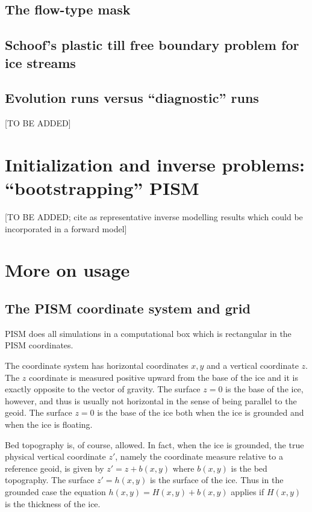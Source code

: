 \documentclass[11pt,final]{amsart}
\begin{document}
\subsection{The flow-type mask} \label{subsect:mask}  

\subsection{Schoof's plastic till free boundary problem for ice streams}  

\subsection{Evolution runs versus ``diagnostic'' runs}  [TO BE ADDED]



\clearpage
\newpage
\section{Initialization and inverse problems: ``bootstrapping'' PISM}\label{sect:boot}  [TO BE ADDED; cite \cite{JoughinMacAyealTulaczyk} as representative inverse modelling results which could be incorporated in a forward model]


\clearpage
\newpage
\section{More on usage}\label{sect:usage}

\subsection{The PISM coordinate system and grid} \label{subsect:coords} PISM does all simulations in a computational box which is rectangular in the PISM coordinates.

The coordinate system has horizontal coordinates $x,y$ and a vertical coordinate $z$.  The $z$ coordinate is measured positive upward from the base of the ice and it is exactly opposite to the vector of gravity.  The surface $z=0$ is the base of the ice, however, and thus is usually not horizontal in the sense of being parallel to the geoid.   The surface $z=0$ is the base of the ice both when the ice is grounded and when the ice is floating.

Bed topography is, of course, allowed.  In fact, when the ice is grounded, the true physical vertical coordinate $z'$, namely the coordinate measure relative to a reference geoid, is given by $z'=z+b(x,y)$ where $b(x,y)$ is the bed topography.  The surface $z'=h(x,y)$ is the surface of the ice.  Thus in the grounded case the equation $h(x,y)=H(x,y)+b(x,y)$ applies if $H(x,y)$ is the thickness of the ice.
\end{document}
